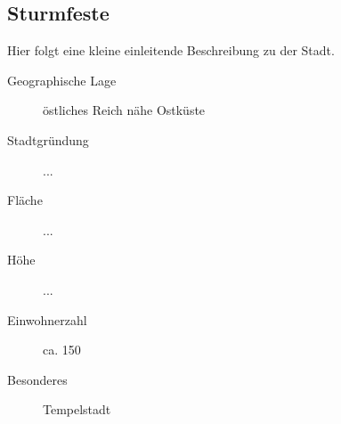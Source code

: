 \subsection{Sturmfeste}
\par Hier folgt eine kleine einleitende Beschreibung zu der Stadt.

\begin{description}
\item [Geographische Lage] östliches Reich nähe Ostküste
\item [Stadtgründung] ...
\item [Fläche] ...
\item [Höhe] ...
\item [Einwohnerzahl] ca. 150
\item [Besonderes] Tempelstadt
\end{description}